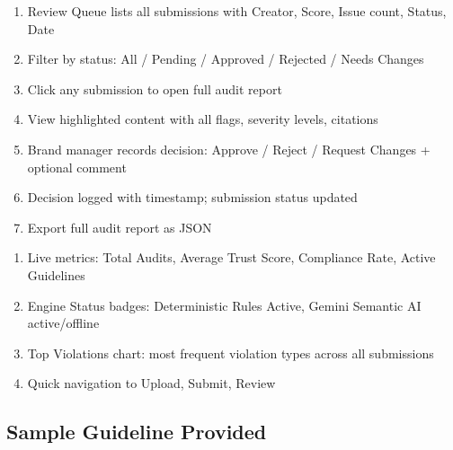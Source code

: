 \documentclass[11pt,a4paper]{article}
\begin{document}
\vspace{0.5cm}

\begin{tcolorbox}[colback=lightgray, colframe=primaryblue, arc=2mm, boxrule=0.5pt, title=\textbf{Flow 3: Human Approval Workflow (/review)}]
\begin{enumerate}[nosep]
    \item Review Queue lists all submissions with Creator, Score, Issue count, Status, Date
    \item Filter by status: All / Pending / Approved / Rejected / Needs Changes
    \item Click any submission to open full audit report
    \item View highlighted content with all flags, severity levels, citations
    \item Brand manager records decision: Approve / Reject / Request Changes + optional comment
    \item Decision logged with timestamp; submission status updated
    \item Export full audit report as JSON
\end{enumerate}
\end{tcolorbox}

\vspace{0.5cm}

\begin{tcolorbox}[colback=lightgray, colframe=primaryblue, arc=2mm, boxrule=0.5pt, title=\textbf{Flow 4: Governance Dashboard (/)}]
\begin{enumerate}[nosep]
    \item Live metrics: Total Audits, Average Trust Score, Compliance Rate, Active Guidelines
    \item Engine Status badges: Deterministic Rules Active, Gemini Semantic AI active/offline
    \item Top Violations chart: most frequent violation types across all submissions
    \item Quick navigation to Upload, Submit, Review
\end{enumerate}
\end{tcolorbox}

\subsection{Sample Guideline Provided}
\end{document}
